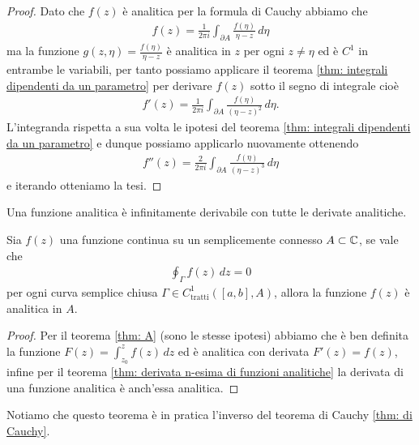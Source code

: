 \begin{proof}
  Dato che $ f(z) $ è analitica per la formula di Cauchy abbiamo che 
  \begin{align}
    f(z) = \frac1{2\pi i} \int_{\partial A} \frac{f(\eta)}{\eta - z} \, d\eta
  \end{align}
  ma la funzione $ g(z, \eta) = \frac{f(\eta)}{\eta - z} $ è analitica in $ z $ per ogni $ z \neq \eta $ ed è $ C^1 $ in entrambe le variabili, per tanto 
  possiamo applicare il teorema \ref{thm: integrali dipendenti da un parametro} per derivare $ f(z) $ sotto il segno di integrale cioè
  \begin{align}
    f'(z) = \frac1{2\pi i} \int_{\partial A} \frac{f(\eta)}{(\eta - z)^2} \, d\eta.
  \end{align}
  L'integranda rispetta a sua volta le ipotesi del teorema \ref{thm: integrali dipendenti da un parametro} e dunque possiamo applicarlo nuovamente 
  ottenendo 
  \begin{align}
    f''(z) = \frac2{2\pi i} \int_{\partial A} \frac{f(\eta)}{(\eta - z)^3} \, d\eta
  \end{align}
  e iterando otteniamo la tesi.
\end{proof}

\begin{corollary}
  Una funzione analitica è infinitamente derivabile con tutte le derivate analitiche.
\end{corollary}

\begin{theorem}[ di Morera ]
  Sia $ f(z) $ una funzione continua su un semplicemente connesso $ A \subset \mathbb{C} $, se vale che 
  \begin{align}
    \oint_\Gamma f(z) \,dz = 0
  \end{align}
  per ogni curva semplice chiusa $ \Gamma \in C^1_{\text{tratti}}([a,b], A) $, allora la funzione $ f(z) $ è analitica in $ A $.
\end{theorem}
\begin{proof}
  Per il teorema \ref{thm: A} (sono le stesse ipotesi) abbiamo che è ben definita la funzione $ F(z) = \int_{z_0}^z f(z) \,dz $ ed è analitica 
  con derivata $ F'(z) = f(z) $, infine per il teorema \ref{thm: derivata n-esima di funzioni analitiche} la derivata di una funzione analitica 
  è anch'essa analitica.
\end{proof}

Notiamo che questo teorema è in pratica l'inverso del teorema di Cauchy \ref{thm: di Cauchy}.

